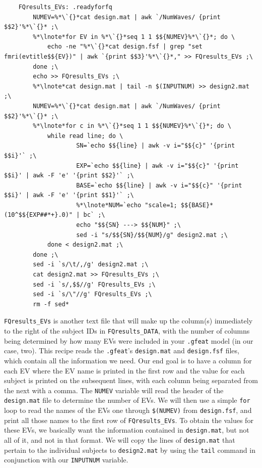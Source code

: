 \begin{lstlisting}
	FQresults_EVs: .readyforfq
		NUMEV=%*\`{}*cat design.mat | awk `/NumWaves/ {print $$2}'%*\`{}* ;\
		%*\lnote*for EV in %*\`{}*seq 1 1 $${NUMEV}%*\`{}*; do \
			echo -ne "%*\`{}*cat design.fsf | grep "set fmri(evtitle$${EV})" | awk `{print $$3}'%*\`{}*," >> FQresults_EVs ;\
		done ;\
		echo >> FQresults_EVs ;\
		%*\lnote*cat design.mat | tail -n $(INPUTNUM) >> design2.mat ;\
		NUMEV=%*\`{}*cat design.mat | awk `/NumWaves/ {print $$2}'%*\`{}* ;\
		%*\lnote*for c in %*\`{}*seq 1 1 $${NUMEV}%*\`{}*; do \
		 	while read line; do \
					SN=`echo $${line} | awk -v i="$${c}" '{print $$i}'` ;\
					EXP=`echo $${line} | awk -v i="$${c}" '{print $$i}' | awk -F 'e' '{print $$2}'` ;\
					BASE=`echo $${line} | awk -v i="$${c}" '{print $$i}' | awk -F 'e' '{print $$1}'` ;\
					%*\lnote*NUM=`echo "scale=1; $${BASE}*(10^$${EXP##*+}.0)" | bc` ;\
					echo "$${SN} ---> $${NUM}" ;\
					sed -i "s/$${SN}/$${NUM}/g" design2.mat ;\
			done < design2.mat ;\
		done ;\
		sed -i `s/\t/,/g' design2.mat ;\
		cat design2.mat >> FQresults_EVs ;\
		sed -i `s/,$$//g' FQresults_EVs ;\
		sed -i `s/\"//g' FQresults_EVs ;\
		rm -f sed*
\end{lstlisting}
\texttt{FQresults_EVs} is another text file that will make up the column(s) immediately to the right of the subject IDs in \texttt{FQresults_DATA}, with the number of columns being determined by how many EVs were included in your \texttt{.gfeat} model (in our case, two). This recipe reads the \texttt{.gfeat}'s \texttt{design.mat} and \texttt{design.fsf} files, which contain all the information we need. Our end goal is to have a column for each EV where the EV name is printed in the first row and the value for each subject is printed on the subsequent lines, with each column being separated from the next with a comma. The \texttt{NUMEV} variable will read the header of the \texttt{design.mat} file to determine the number of EVs.  We will then use a simple \texttt{for} loop to read the names of the EVs one through \texttt{\$(NUMEV)} from \texttt{design.fsf}, and print all those names to the first row of \texttt{FQresults_EVs}. To obtain the values for these EVs, we basically want the information contained in \texttt{design.mat}, but not all of it, and not in that format. We will copy the lines of \texttt{design.mat} that pertain to the individual subjects to \texttt{design2.mat} by using the \texttt{tail} command in conjunction with our \texttt{INPUTNUM} variable. 

